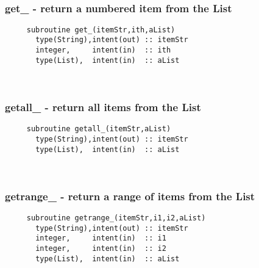  
\mbox{}\hrulefill\ 
 

  \subsubsection{get\_ - return a numbered item from the List}

\begin{verbatim} 
     subroutine get_(itemStr,ith,aList)
       type(String),intent(out) :: itemStr
       integer,     intent(in)  :: ith
       type(List),  intent(in)  :: aList
 \end{verbatim} %
 
 
\mbox{}\hrulefill\ 
 

  \subsubsection{getall\_ - return all items from the List}

\begin{verbatim} 
     subroutine getall_(itemStr,aList)
       type(String),intent(out) :: itemStr
       type(List),  intent(in)  :: aList
 \end{verbatim} %
 
 
\mbox{}\hrulefill\ 
 
  \subsubsection{getrange\_ - return a range of items from the List}

\begin{verbatim} 
     subroutine getrange_(itemStr,i1,i2,aList)
       type(String),intent(out) :: itemStr
       integer,     intent(in)  :: i1
       integer,     intent(in)  :: i2
       type(List),  intent(in)  :: aList
 \end{verbatim} %
 
